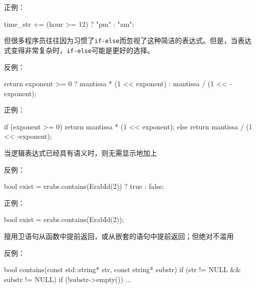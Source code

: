 \begin{content}
正例：
\begin{leftbar}
\begin{c++}
time_str += (hour >= 12) ? "pm" : "am";
\end{c++}
\end{leftbar}

但很多程序员往往因为习惯了\texttt{if-else}而忽视了这种简洁的表达式。但是，当表达式变得非常复杂时，\texttt{if-else}可能是更好的选择。

反例：
\begin{leftbar}
\begin{c++}
return exponent >= 0 ? mantissa * (1 << exponent) : mantissa / (1 << -exponent);
\end{c++}
\end{leftbar}

正例：
\begin{leftbar}
\begin{c++}
if (exponent >= 0)
{
    return mantissa * (1 << exponent);
}
else
{
    return mantissa / (1 << -exponent);
}
\end{c++}
\end{leftbar}

\begin{regulation}
当逻辑表达式已经具有语义时，则无需显示地加上
\end{regulation}

反例：
\begin{leftbar}
\begin{c++}
bool exist = erabs.contains(ErabId(2)) ? true : false;
\end{c++}
\end{leftbar}

正例：
\begin{leftbar}
\begin{c++}
bool exist = erabs.contains(ErabId(2));
\end{c++}
\end{leftbar}

\begin{regulation}
擅用卫语句从函数中提前返回，或从嵌套的语句中提前返回；但绝对不滥用
\end{regulation}

反例：
\begin{leftbar}
\begin{c++}
bool contains(const std::string* str, const string* substr) 
{
    if (str != NULL && substr != NULL)
    {
        if (!substr->empty())
        {
            ...
        } 
    }
}
\end{c++}
\end{leftbar}


\end{content}
